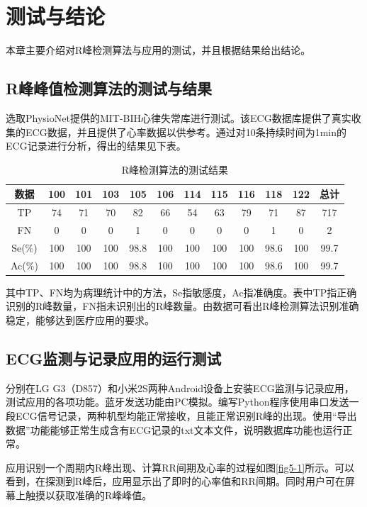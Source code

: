 \setcounter{figure}{0}
\setcounter{table}{0}
\section{测试与结论}
本章主要介绍对R峰检测算法与应用的测试，并且根据结果给出结论。

\subsection{R峰峰值检测算法的测试与结果}
选取PhysioNet提供的MIT-BIH心律失常库进行测试\cite{goldberger_physiobank_2000}\cite{moody_impact_2001}。该ECG数据库提供了真实收集的ECG数据，并且提供了心率数据以供参考。通过对10条持续时间为1min的ECG记录进行分析，得出的结果见下表。

\begin{table}[htbp]
  \centering
  \caption{R峰检测算法的测试结果 %
  \label{t2}}
  \wuhao
\begin{tabular}{|c|c|c|c|c|c|c|c|c|c|c|c|}
\hline 
数据 & 100 & 101 & 103 & 105 & 106 & 114 & 115 & 116 & 118 & 122 & 总计 \\ 
\hline 
TP & 74 & 71 & 70 & 82 & 66 & 54 & 63 & 79 & 71 & 87 & 717 \\ 
\hline 
FN & 0 & 0 & 0 & 1 & 0 & 0 & 0 & 0 & 1 & 0 & 2 \\ 
\hline 
Se(\%) & 100 & 100 & 100 & 98.8 & 100 & 100 & 100 & 100 & 98.6 & 100 & 99.7 \\ 
\hline 
Ac(\%) & 100 & 100 & 100 & 98.8 & 100 & 100 & 100 & 100 & 98.6 & 100 & 99.7 \\ 
\hline 
\end{tabular}  
\end{table}

其中TP、FN均为病理统计中的方法，Se指敏感度，Ac指准确度\cite{department_of_statistics_online_programs_sensitivity_????}。表中TP指正确识别的R峰数量，FN指未识别出的R峰数量。由数据可看出R峰检测算法识别准确稳定，能够达到医疗应用的要求。

\subsection{ECG监测与记录应用的运行测试}
分别在LG G3（D857）和小米2S两种Android设备上安装ECG监测与记录应用，测试应用的各项功能。蓝牙发送功能由PC模拟。编写Python程序使用串口发送一段ECG信号记录，两种机型均能正常接收，且能正常识别R峰的出现。使用“导出数据”功能能够正常生成含有ECG记录的txt文本文件，说明数据库功能也运行正常。

应用识别一个周期内R峰出现、计算RR间期及心率的过程如图\ref{fig5-1}所示。可以看到，在探测到R峰后，应用显示出了即时的心率值和RR间期。同时用户可在屏幕上触摸以获取准确的R峰峰值。

